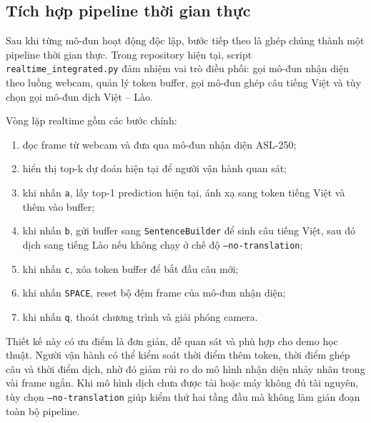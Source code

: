 ﻿\subsection{Tích hợp pipeline thời gian thực}

Sau khi từng mô-đun hoạt động độc lập, bước tiếp theo là ghép chúng thành một pipeline thời gian thực. Trong repository hiện tại, script \texttt{realtime\_integrated.py} đảm nhiệm vai trò điều phối: gọi mô-đun nhận diện theo luồng webcam, quản lý token buffer, gọi mô-đun ghép câu tiếng Việt và tùy chọn gọi mô-đun dịch Việt -- Lào.

Vòng lặp realtime gồm các bước chính:
\begin{enumerate}
    \item đọc frame từ webcam và đưa qua mô-đun nhận diện ASL-250;
    \item hiển thị top-k dự đoán hiện tại để người vận hành quan sát;
    \item khi nhấn \texttt{a}, lấy top-1 prediction hiện tại, ánh xạ sang token tiếng Việt và thêm vào buffer;
    \item khi nhấn \texttt{b}, gửi buffer sang \texttt{SentenceBuilder} để sinh câu tiếng Việt, sau đó dịch sang tiếng Lào nếu không chạy ở chế độ \texttt{--no-translation};
    \item khi nhấn \texttt{c}, xóa token buffer để bắt đầu câu mới;
    \item khi nhấn \texttt{SPACE}, reset bộ đệm frame của mô-đun nhận diện;
    \item khi nhấn \texttt{q}, thoát chương trình và giải phóng camera.
\end{enumerate}

Thiết kế này có ưu điểm là đơn giản, dễ quan sát và phù hợp cho demo học thuật. Người vận hành có thể kiểm soát thời điểm thêm token, thời điểm ghép câu và thời điểm dịch, nhờ đó giảm rủi ro do mô hình nhận diện nhảy nhãn trong vài frame ngắn. Khi mô hình dịch chưa được tải hoặc máy không đủ tài nguyên, tùy chọn \texttt{--no-translation} giúp kiểm thử hai tầng đầu mà không làm gián đoạn toàn bộ pipeline.

